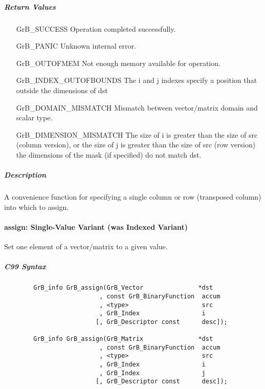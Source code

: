 \subparagraph{Return Values}

\begin{itemize}[leftmargin=2.1in]
\item[{\sf GrB\_SUCCESS}]             Operation completed successfully.
\item[{\sf GrB\_PANIC}]               Unknown internal error.
\item[{\sf GrB\_OUTOFMEM}]            Not enough memory available for operation.
\item[{\sf GrB\_INDEX\_OUTOFBOUNDS}]  The i and j indexes specify a position that outside the dimensions of dst
\item[{\sf GrB\_DOMAIN\_MISMATCH}]    Mismatch between vector/matrix domain and scalar type.
\item[{\sf GrB\_DIMENSION\_MISMATCH}] 
        The size of {\sf i} is greater than the size of {\sf src} (column version), or
        the size of {\sf j} is greater than the size of {\sf src} (row version)
        the dimensions of the mask (if specified) do not match {\sf dst}.
\end{itemize}

\subparagraph{Description}

A convenience function for specifying a single column or row (transposed column) into which to assign.

\paragraph{{\sf assign}: Single-Value Variant (was Indexed Variant)}

Set one element of a vector/matrix to a given value.

\subparagraph{C99 Syntax}

\begin{verbatim}
        GrB_info GrB_assign(GrB_Vector               *dst
                          , const GrB_BinaryFunction  accum
                          , <type>                    src
                          , GrB_Index                 i
                         [, GrB_Descriptor const      desc]); 

        GrB_info GrB_assign(GrB_Matrix               *dst
                          , const GrB_BinaryFunction  accum
                          , <type>                    src
                          , GrB_Index                 i
                          , GrB_Index                 j
                         [, GrB_Descriptor const      desc]); 
\end{verbatim}

